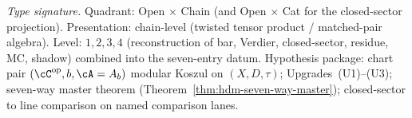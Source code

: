 \begin{proposition}
\label{prop:hdm-u-a-recoverability}
\emph{Type signature.} Quadrant: Open $\times$ Chain (and Open $\times$
Cat for the closed-sector projection). Presentation: chain-level
(twisted tensor product / matched-pair algebra). Level: $1, 2, 3, 4$
(reconstruction of bar, Verdier, closed-sector, residue, MC, shadow)
combined into the seven-entry datum. Hypothesis package: chart pair
$(\cC^{\mathrm{op}}, b, \cA = A_b)$ modular Koszul on $(X, D, \tau)$;
Upgrades~\textup{(U1)--(U3)}; seven-way master theorem
\textup{(}Theorem~\ref{thm:hdm-seven-way-master}\textup{)}; closed-sector
to line comparison on named comparison lanes.


\end{proposition}
